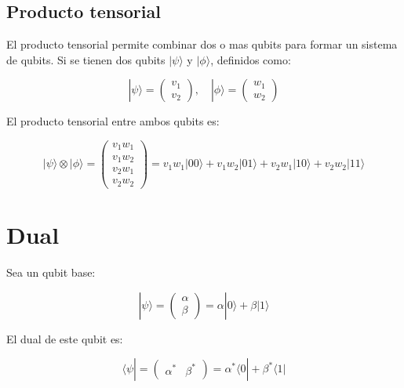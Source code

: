 \documentclass[11pt]{article}
\begin{document}
\subsection{Producto tensorial}

El producto tensorial permite combinar dos o mas qubits para formar un sistema de qubits. Si se tienen dos qubits $|\psi\rangle$ y $|\phi\rangle$, definidos como:

\begin{equation}
    |\psi\rangle = \begin{pmatrix} v_1 \\ v_2 \end{pmatrix}, \quad |\phi\rangle = \begin{pmatrix} w_1 \\ w_2 \end{pmatrix}
\end{equation}

El producto tensorial entre ambos qubits es:

\begin{equation}
    |\psi\rangle \otimes |\phi\rangle = \begin{pmatrix} v_1 w_1 \\ v_1 w_2 \\ v_2 w_1 \\ v_2 w_2 \end{pmatrix} = v_1 w_1 |00\rangle + v_1 w_2 |01\rangle + v_2 w_1 |10\rangle + v_2 w_2 |11\rangle
\end{equation}

\section{Dual}

Sea un qubit base:

\begin{equation}
    |\psi\rangle = \begin{pmatrix} \alpha \\ \beta \end{pmatrix} = \alpha |0\rangle + \beta |1\rangle
\end{equation}

El dual de este qubit es:

\begin{equation}
    \langle \psi | = \begin{pmatrix} \alpha^* & \beta^* \end{pmatrix} = \alpha^* \langle 0| + \beta^* \langle 1|
\end{equation}
\end{document}
